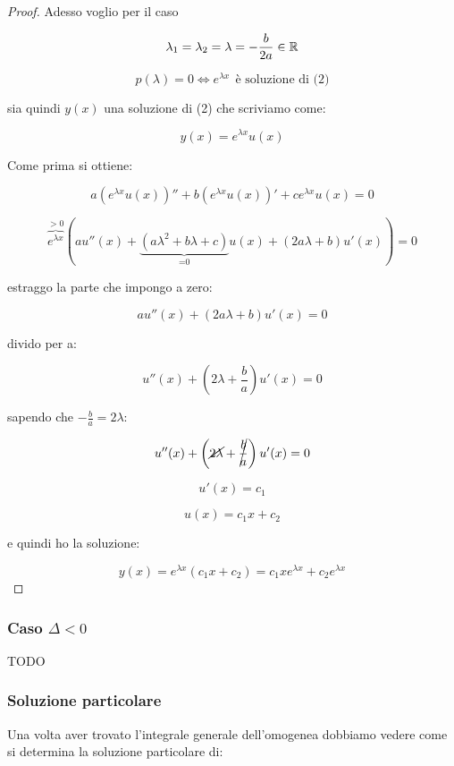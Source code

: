 \begin{proof}
    Adesso voglio per il caso 

    \[
        \lambda_1 = \lambda_2 = \lambda = -\frac{b}{2a} \in \mathbb{R}
    \]

    \[
        p(\lambda) =0 \iff e ^{\lambda x}\ \ \text{è soluzione di (2)}
    \]

    sia quindi \(y(x)\) una soluzione di (2) che scriviamo come:

    \[
        y(x) = e ^{\lambda x}u(x)
    \]

    Come prima si ottiene:

    \[
        a(e ^{\lambda x}u(x) )''+ b(e ^{\lambda x}u(x))' + c e ^{\lambda x}u(x)=0
    \]

    \[
        \overbrace{e ^{\lambda x}}^{>0}(a u''(x) + \underbrace{(a \lambda^{2}+b \lambda +c )}_\text{=0} u(x) + (2a \lambda+b)u'(x))=0
    \]

    estraggo la parte che impongo a zero:

    \[
        au''(x) + (2a \lambda+b)u'(x) = 0
    \]

    divido per a:

    \[
        u''(x) + \left( 2 \lambda + \frac{b}{a} \right)u'(x) = 0
    \]

    sapendo che \(-\frac{b}{a} = 2 \lambda \):

    \[
        u''(x) + \left( \cancel{2 \lambda} + \cancel{\frac{b}{a}} \right)u'(x) = 0
    \]


    \[
        u'(x) = c_1
    \]

    \[
        u(x) = c_1 x +c_2
    \]

    e quindi ho la soluzione:

    \[
        y(x) = e ^{\lambda x}(c_1x+c_2) = c_1x e^{\lambda x}+ c_2 e ^{\lambda x}
    \]
\end{proof}

\filbreak{}

\subsubsection*{Caso \(\Delta < 0\)}

TODO

\filbreak{}
\subsubsection{Soluzione particolare}

Una volta aver trovato l'integrale generale dell'omogenea dobbiamo vedere come si determina la soluzione particolare di:

